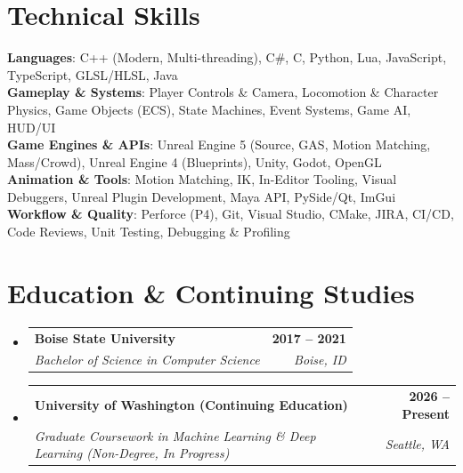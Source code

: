 \documentclass[letterpaper,11pt]{article}
\makeatletter
\newcommand{\resumeSubheading}[4]{
  \vspace{-2pt}\item
    \begin{tabular*}{1.0\textwidth}[t]{l@{\extracolsep{\fill}}r}
      \textbf{#1} & \textbf{\small #2} \\
      \textit{\small#3} & \textit{\small #4} \\
    \end{tabular*}\vspace{-7pt}
}
\newcommand{\resumeSubHeadingListStart}{\begin{itemize}[leftmargin=0.0in, label={}]}
\newcommand{\resumeSubHeadingListEnd}{\end{itemize}}
\makeatother
\begin{document}
\section{Technical Skills}
 \begin{itemize}[leftmargin=0.15in, label={}]
    \small{\item{
     \textbf{Languages}{: C++ (Modern, Multi-threading), C\#, C, Python, Lua, JavaScript, TypeScript, GLSL/HLSL, Java} \\
     \textbf{Gameplay \& Systems}{: Player Controls \& Camera, Locomotion \& Character Physics, Game Objects (ECS), State Machines, Event Systems, Game AI, HUD/UI} \\
     \textbf{Game Engines \& APIs}{: Unreal Engine 5 (Source, GAS, Motion Matching, Mass/Crowd), Unreal Engine 4 (Blueprints), Unity, Godot, OpenGL} \\
     \textbf{Animation \& Tools}{: Motion Matching, IK, In-Editor Tooling, Visual Debuggers, Unreal Plugin Development, Maya API, PySide/Qt, ImGui} \\
     \textbf{Workflow \& Quality}{: Perforce (P4), Git, Visual Studio, CMake, JIRA, CI/CD, Code Reviews, Unit Testing, Debugging \& Profiling}
    }}
 \end{itemize}
 \vspace{-12pt}

\section{Education \& Continuing Studies}
  \resumeSubHeadingListStart
    \resumeSubheading
      {Boise State University}{2017 -- 2021}
      {Bachelor of Science in Computer Science}{Boise, ID}
    \resumeSubheading
      {University of Washington (Continuing Education)}{2026 -- Present}
      {Graduate Coursework in Machine Learning \& Deep Learning (Non-Degree, In Progress)}{Seattle, WA}
  \resumeSubHeadingListEnd
\end{document}
